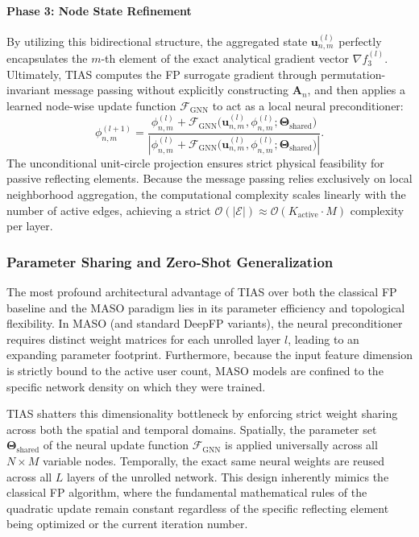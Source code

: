 \documentclass[journal]{IEEEtran}
\begin{document}
\paragraph{Phase 3: Node State Refinement}
By utilizing this bidirectional structure, the aggregated state $\mathbf{u}_{n,m}^{(l)}$ perfectly encapsulates the $m$-th element of the exact analytical gradient vector $\nabla f_3^{(l)}$. Ultimately, TIAS computes the FP surrogate gradient through permutation-invariant message passing without explicitly constructing $\mathbf{A}_n$, and then applies a learned node-wise update function $\mathcal{F}_{\text{GNN}}$ to act as a local neural preconditioner:
\begin{equation}
    \phi_{n,m}^{(l+1)} = \frac{\phi_{n,m}^{(l)} + \mathcal{F}_{\text{GNN}} \big( \mathbf{u}_{n,m}^{(l)}, \phi_{n,m}^{(l)} ; \mathbf{\Theta}_{\text{shared}} \big)}{\left| \phi_{n,m}^{(l)} + \mathcal{F}_{\text{GNN}} \big( \mathbf{u}_{n,m}^{(l)}, \phi_{n,m}^{(l)} ; \mathbf{\Theta}_{\text{shared}} \big) \right|}.
    \label{eq:tias_node_update}
\end{equation}
The unconditional unit-circle projection ensures strict physical feasibility for passive reflecting elements. Because the message passing relies exclusively on local neighborhood aggregation, the computational complexity scales linearly with the number of active edges, achieving a strict $\mathcal{O}(|\mathcal{E}|) \approx \mathcal{O}(K_{\text{active}} \cdot M)$ complexity per layer.

\subsubsection{Parameter Sharing and Zero-Shot Generalization}
\label{subsubsec:tias_generalization}

The most profound architectural advantage of TIAS over both the classical FP baseline and the MASO paradigm lies in its parameter efficiency and topological flexibility. In MASO (and standard DeepFP variants), the neural preconditioner requires distinct weight matrices for each unrolled layer $l$, leading to an expanding parameter footprint. Furthermore, because the input feature dimension is strictly bound to the active user count, MASO models are confined to the specific network density on which they were trained.

TIAS shatters this dimensionality bottleneck by enforcing strict weight sharing across both the spatial and temporal domains. Spatially, the parameter set $\mathbf{\Theta}_{\text{shared}}$ of the neural update function $\mathcal{F}_{\text{GNN}}$ is applied universally across all $N \times M$ variable nodes. Temporally, the exact same neural weights are reused across all $L$ layers of the unrolled network. This design inherently mimics the classical FP algorithm, where the fundamental mathematical rules of the quadratic update remain constant regardless of the specific reflecting element being optimized or the current iteration number.
\end{document}
